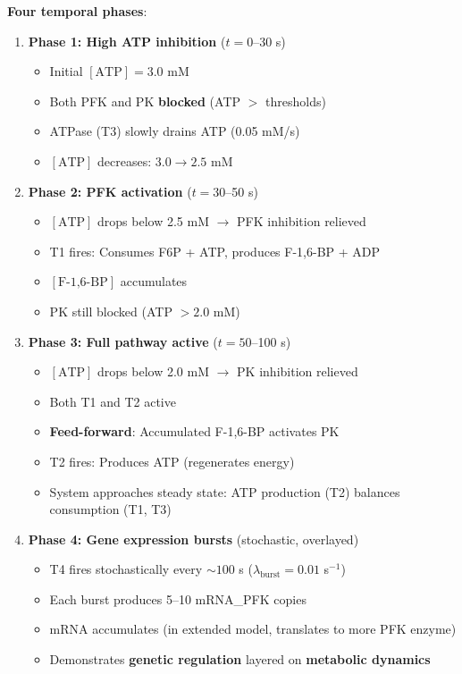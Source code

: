 \textbf{Four temporal phases}:

\begin{enumerate}
    \item \textbf{Phase 1: High ATP inhibition} ($t = 0$--30 s)
    \begin{itemize}
        \item Initial $[\text{ATP}] = 3.0$ mM
        \item Both PFK and PK \textbf{blocked} (ATP $>$ thresholds)
        \item ATPase (T3) slowly drains ATP (0.05 mM/s)
        \item $[\text{ATP}]$ decreases: $3.0 \to 2.5$ mM
    \end{itemize}
    
    \item \textbf{Phase 2: PFK activation} ($t = 30$--50 s)
    \begin{itemize}
        \item $[\text{ATP}]$ drops below 2.5 mM $\to$ PFK inhibition relieved
        \item T1 fires: Consumes F6P + ATP, produces F-1,6-BP + ADP
        \item $[\text{F-1,6-BP}]$ accumulates
        \item PK still blocked (ATP $> 2.0$ mM)
    \end{itemize}
    
    \item \textbf{Phase 3: Full pathway active} ($t = 50$--100 s)
    \begin{itemize}
        \item $[\text{ATP}]$ drops below 2.0 mM $\to$ PK inhibition relieved
        \item Both T1 and T2 active
        \item \textbf{Feed-forward}: Accumulated F-1,6-BP activates PK
        \item T2 fires: Produces ATP (regenerates energy)
        \item System approaches steady state: ATP production (T2) balances consumption (T1, T3)
    \end{itemize}
    
    \item \textbf{Phase 4: Gene expression bursts} (stochastic, overlayed)
    \begin{itemize}
        \item T4 fires stochastically every $\sim100$ s ($\lambda_{\text{burst}} = 0.01$ s$^{-1}$)
        \item Each burst produces 5--10 mRNA\_PFK copies
        \item mRNA accumulates (in extended model, translates to more PFK enzyme)
        \item Demonstrates \textbf{genetic regulation} layered on \textbf{metabolic dynamics}
    \end{itemize}
\end{enumerate}

